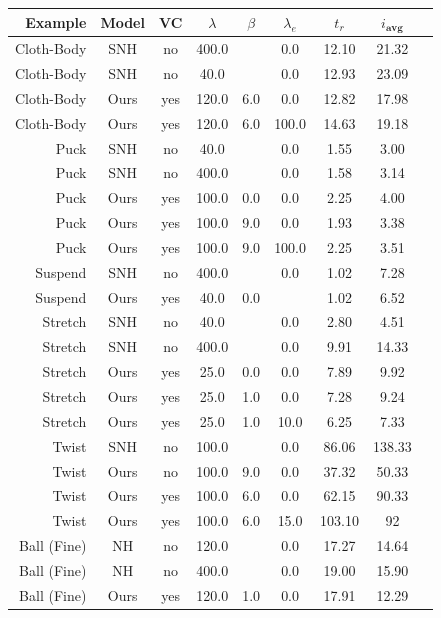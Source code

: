 \begin{table}[]
	\centering
	\begin{tabular}{@{}rcccccccc@{}}
		\toprule
		Example & Model & VC & $\lambda$ & $\beta$ & $\lambda_e$ & $t_r$ & $ i_{\textbf{avg}}$ \\
		\midrule
		Cloth-Body & SNH & no & 400.0 &  & 0.0 & 12.10 & 21.32 \\
		Cloth-Body & SNH & no & 40.0 &  & 0.0 & 12.93 & 23.09 \\
		Cloth-Body & Ours & yes & 120.0 & 6.0 & 0.0 & 12.82 & 17.98 \\
		Cloth-Body & Ours & yes & 120.0 & 6.0 &  100.0 & 14.63 & 19.18 \\
		\midrule
		Puck & SNH & no & 40.0 &   & 0.0 & 1.55 & 3.00 \\
		Puck & SNH & no & 400.0 &   & 0.0 & 1.58 & 3.14 \\
		Puck & Ours & yes & 100.0 & 0.0 & 0.0 & 2.25 & 4.00 \\
		Puck & Ours & yes & 100.0 & 9.0 & 0.0 & 1.93 & 3.38 \\
		Puck & Ours & yes & 100.0 & 9.0 & 100.0 & 2.25 & 3.51 \\
		\midrule
		Suspend & SNH & no & 400.0 & & 0.0 & 1.02 & 7.28 \\
		Suspend & Ours & yes & 40.0 & 0.0 &  & 1.02 & 6.52 \\
		\midrule
		Stretch & SNH & no & 40.0 & & 0.0 & 2.80 & 4.51 \\
		Stretch & SNH & no & 400.0 & & 0.0 & 9.91 & 14.33 \\
		Stretch & Ours & yes & 25.0 & 0.0 & 0.0 & 7.89 & 9.92 \\
		Stretch & Ours & yes & 25.0 & 1.0 & 0.0 & 7.28 & 9.24 \\
		Stretch & Ours & yes & 25.0 & 1.0 & 10.0 & 6.25 & 7.33 \\
		\midrule
		Twist & SNH & no & 100.0 & & 0.0 & 86.06 & 138.33 \\
		Twist & Ours & no & 100.0 & 9.0 & 0.0 & 37.32 & 50.33 \\
		Twist & Ours & yes & 100.0 & 6.0 & 0.0 & 62.15 & 90.33 \\
		Twist & Ours & yes & 100.0 & 6.0 &  15.0  & 103.10 & 92 \\
		\midrule
		Ball (Fine) & NH & no & 120.0 & & 0.0 & 17.27 & 14.64 \\
		Ball (Fine) & NH & no & 400.0 & & 0.0 & 19.00 & 15.90 \\
		Ball (Fine) & Ours & yes & 120.0 & 1.0 & 0.0 & 17.91 & 12.29 \\

\end{tabular}
\end{table}
